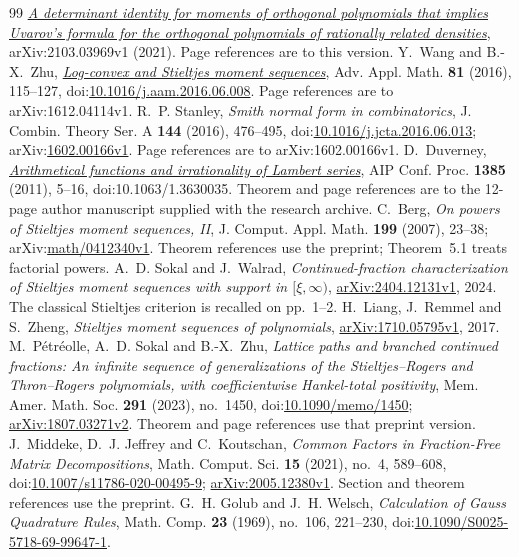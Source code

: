 \begin{thebibliography}{99}
  \href{https://arxiv.org/abs/2103.03969v1}{\emph{A determinant identity for
  moments of orthogonal polynomials that implies Uvarov's formula for the
  orthogonal polynomials of rationally related densities}},
  arXiv:2103.03969v1 (2021). Page references are to this version.
 Y.~Wang and B.-X.~Zhu,
  \href{https://arxiv.org/abs/1612.04114v1}{\emph{Log-convex and Stieltjes
  moment sequences}}, Adv. Appl. Math. \textbf{81} (2016), 115--127,
  doi:\href{https://doi.org/10.1016/j.aam.2016.06.008}{10.1016/j.aam.2016.06.008}.
  Page references are to arXiv:1612.04114v1.
 R.~P. Stanley, \emph{Smith normal form in combinatorics},
  J. Combin. Theory Ser. A \textbf{144} (2016), 476--495,
  doi:\href{https://doi.org/10.1016/j.jcta.2016.06.013}{10.1016/j.jcta.2016.06.013};
  arXiv:\href{https://arxiv.org/abs/1602.00166v1}{1602.00166v1}.
  Page references are to arXiv:1602.00166v1.
 D.~Duverney,
  \href{https://doi.org/10.1063/1.3630035}{\emph{Arithmetical functions and
  irrationality of Lambert series}}, AIP Conf. Proc. \textbf{1385} (2011),
  5--16, doi:10.1063/1.3630035. Theorem and page references are to the
  12-page author manuscript supplied with the research archive.
 C.~Berg, \emph{On powers of Stieltjes moment sequences, II},
  J. Comput. Appl. Math. \textbf{199} (2007), 23--38;
  arXiv:\href{https://arxiv.org/abs/math/0412340v1}{math/0412340v1}.
  Theorem references use the preprint; Theorem~5.1 treats factorial powers.
 A.~D. Sokal and J.~Walrad,
  \emph{Continued-fraction characterization of Stieltjes moment sequences
  with support in $[\xi,\infty)$},
  \href{https://arxiv.org/abs/2404.12131v1}{arXiv:2404.12131v1}, 2024.
  The classical Stieltjes criterion is recalled on pp.~1--2.
 H.~Liang, J.~Remmel and S.~Zheng,
  \emph{Stieltjes moment sequences of polynomials},
  \href{https://arxiv.org/abs/1710.05795v1}{arXiv:1710.05795v1}, 2017.
 M.~P\'etr\'eolle, A.~D. Sokal and B.-X.~Zhu,
  \emph{Lattice paths and branched continued fractions: An infinite sequence
  of generalizations of the Stieltjes--Rogers and Thron--Rogers polynomials,
  with coefficientwise Hankel-total positivity}, Mem. Amer. Math. Soc.
  \textbf{291} (2023), no.~1450,
  doi:\href{https://doi.org/10.1090/memo/1450}{10.1090/memo/1450};
  \href{https://arxiv.org/abs/1807.03271v2}{arXiv:1807.03271v2}.
  Theorem and page references use that preprint version.
 J.~Middeke, D.~J. Jeffrey and C.~Koutschan,
  \emph{Common Factors in Fraction-Free Matrix Decompositions},
  Math. Comput. Sci. \textbf{15} (2021), no.~4, 589--608,
  doi:\href{https://doi.org/10.1007/s11786-020-00495-9}{10.1007/s11786-020-00495-9};
  \href{https://arxiv.org/abs/2005.12380v1}{arXiv:2005.12380v1}.
  Section and theorem references use the preprint.
 G.~H. Golub and J.~H. Welsch,
  \emph{Calculation of Gauss Quadrature Rules}, Math. Comp. \textbf{23}
  (1969), no.~106, 221--230,
  doi:\href{https://doi.org/10.1090/S0025-5718-69-99647-1}{10.1090/S0025-5718-69-99647-1}.
\end{thebibliography}


